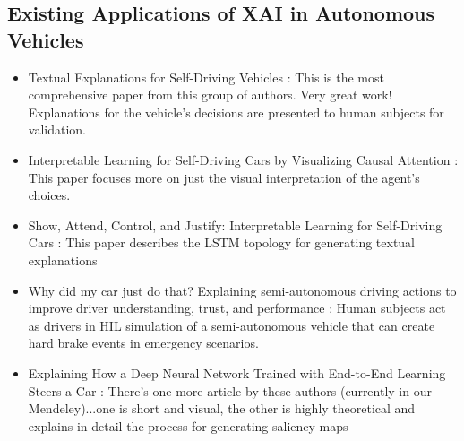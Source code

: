 \subsection{Existing Applications of XAI in Autonomous Vehicles}

\begin{itemize}
    \item Textual Explanations for Self-Driving Vehicles \cite{kim2018textual}: This is the most comprehensive paper from this group of authors.  Very great work!  Explanations for the vehicle's decisions are presented to human subjects for validation.

    \item Interpretable Learning for Self-Driving Cars by Visualizing Causal Attention \cite{Kim2017InterpretableLF}:  This paper focuses more on just the visual interpretation of the agent's choices.

    \item Show, Attend, Control, and Justify: Interpretable Learning for Self-Driving Cars \cite{Kim2017ShowA}: This paper describes the LSTM topology for generating textual explanations

    \item Why did my car just do that? Explaining semi-autonomous driving actions to improve driver understanding, trust, and performance \cite{Koo2015}:  Human subjects act as drivers in HIL simulation of a semi-autonomous vehicle that can create hard brake events in emergency scenarios.
    
    \item Explaining How a Deep Neural Network Trained with End-to-End Learning Steers a Car \cite{Bojarski2017ExplainingHA}: There's one more article by these authors (currently in our Mendeley)...one is short and visual, the other is highly theoretical and explains in detail the process for generating saliency maps
\end{itemize}
